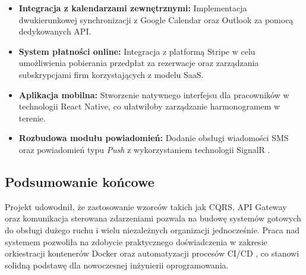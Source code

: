 \begin{itemize}
    \item \textbf{Integracja z kalendarzami zewnętrznymi:} Implementacja dwukierunkowej synchronizacji z Google Calendar oraz Outlook za pomocą dedykowanych API.
    \item \textbf{System płatności online:} Integracja z platformą Stripe \cite{axios_docs} w celu umożliwienia pobierania przedpłat za rezerwacje oraz zarządzania subskrypcjami firm korzystających z modelu SaaS.
    \item \textbf{Aplikacja mobilna:} Stworzenie natywnego interfejsu dla pracowników w technologii React Native, co ułatwiłoby zarządzanie harmonogramem w terenie.
    \item \textbf{Rozbudowa modułu powiadomień:} Dodanie obsługi wiadomości SMS oraz powiadomień typu \textit{Push} z wykorzystaniem technologii SignalR \cite{signalr_microsoft}.
\end{itemize}

\subsection{Podsumowanie końcowe}
Projekt udowodnił, że zastosowanie wzorców takich jak CQRS, API Gateway oraz komunikacja sterowana zdarzeniami pozwala na budowę systemów gotowych do obsługi dużego ruchu i wielu niezależnych organizacji jednocześnie. Praca nad systemem pozwoliła na zdobycie praktycznego doświadczenia w zakresie orkiestracji kontenerów Docker \cite{docker_docs} oraz automatyzacji procesów CI/CD \cite{github_actions_docs}, co stanowi solidną podstawę dla nowoczesnej inżynierii oprogramowania.
